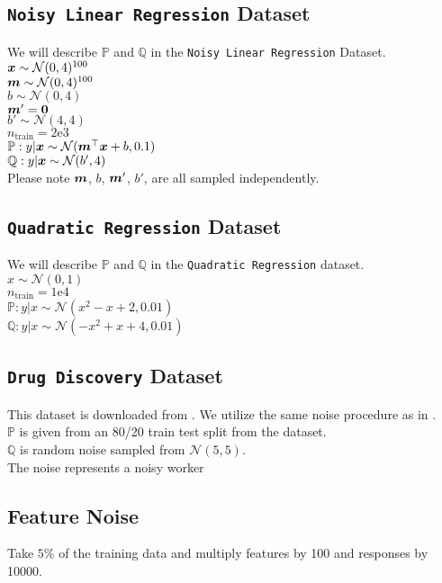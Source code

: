 \documentclass{article} %
\begin{document}
\begin{appendices}
	\subsection{\texttt{Noisy Linear Regression} Dataset}
	We will describe $\mathbb{P}$ and $\mathbb{Q}$ in the \texttt{Noisy Linear Regression} Dataset.\\
	${\bm{x}} \sim \mathcal{N}(0,4)^{100}$\\
	${\bm{m}} \sim \mathcal{N}(0,4)^{100}$\\
	$b \sim \mathcal{N}(0,4)$\\
	${\bm{m}}' = {\bm{0}}$\\
	$b' \sim \mathcal{N}(4,4)$\\
	$n_{\text{train}} = 2\text{e}3$\\
	$\mathbb{P}: y|{\bm{x}} \sim \mathcal{N}({\bm{m}}^\top{\bm{x}} + b, 0.1)$\\
	$\mathbb{Q}: y|{\bm{x}} \sim \mathcal{N}(b', 4)$\\
	Please note ${\bm{m}}$, $b$, ${\bm{m}}'$, $b'$, are all sampled independently. 
	
	\subsection{\texttt{Quadratic Regression} Dataset}
	We will describe $\mathbb{P}$ and $\mathbb{Q}$ in the \texttt{Quadratic Regression} dataset.\\
	$x \sim \mathcal{N}(0,1)$\\
	$n_{\text{train}} = 1\text{e}4$\\
	$\mathbb{P}: y|x \sim \mathcal{N}(x^2 - x + 2, 0.01)$\\
	$\mathbb{Q}: y|x \sim \mathcal{N}(-x^2 + x + 4, 0.01)$
	
	\subsection{\texttt{Drug Discovery} Dataset}
	This dataset is downloaded from \cite{DiakonikolasKKLSS19}. We utilize the same noise procedure as in \cite{li2020tilted}.\\
	$\mathbb{P}$ is given from an 80/20 train test split from the dataset. \\
	$\mathbb{Q}$ is random noise sampled from $\mathcal{N}(5,5)$.\\
	The noise represents a noisy worker
		
	\subsection{Feature Noise}
	Take $5$\% of the training data and multiply features by 100 and responses by 10000. 
	
	\end{appendices}
\end{document}
